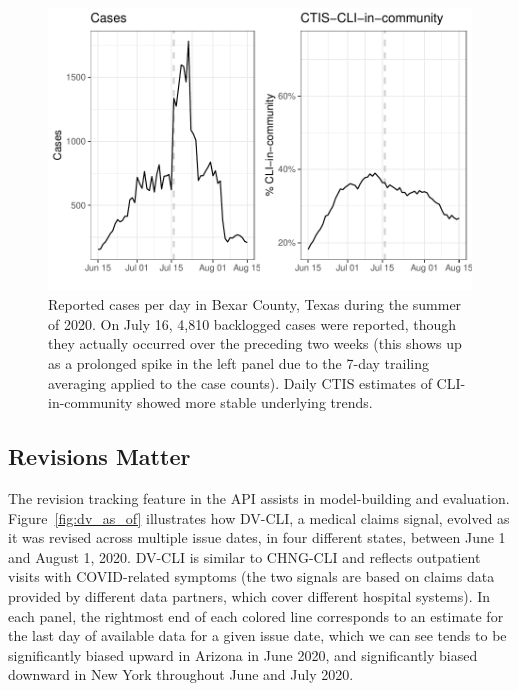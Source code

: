 \documentclass[11pt]{article}
\begin{document}
\begin{figure}[t]
  \centering
  \includegraphics[width=0.8\columnwidth]{fig/bexar_compare.pdf}
  \caption{Reported cases per day in Bexar County, Texas during the summer of
    2020. On July 16, 4,810 backlogged cases were reported, though they actually
    occurred over the preceding two weeks (this shows up as a prolonged spike in
    the left panel due to the 7-day trailing averaging applied to the case
    counts). Daily CTIS estimates of CLI-in-community showed more stable
    underlying trends.}
  \label{fig:bexar_compare}
\end{figure}

\subsection{Revisions Matter}

The revision tracking feature in the API assists in model-building and
evaluation. Figure~\ref{fig:dv_as_of} illustrates how DV-CLI, a medical claims
signal, evolved as it was revised across multiple issue dates, in four different
states, between June 1 and August 1, 2020. DV-CLI is similar to CHNG-CLI and
reflects outpatient visits with COVID-related symptoms (the two signals are
based on claims data provided by different data partners, which cover different
hospital systems). In each panel, the rightmost end of each colored line
corresponds to an estimate for the last day of available data for a given issue
date, which we can see tends to be significantly biased upward in Arizona in
June 2020, and significantly biased downward in New York throughout June and
July 2020.
\end{document}
